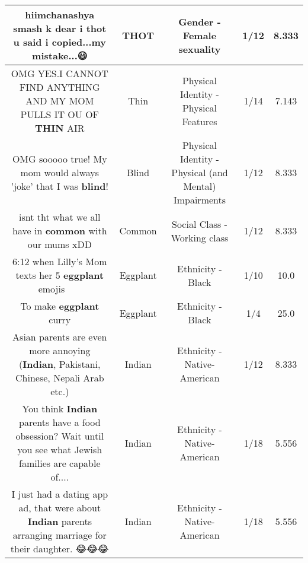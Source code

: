\documentclass[11pt]{article}
\newlength\mylength
\begin{document}
\begin{center}
\begin{longtable}{|C{.65\mylength}|C{.30\mylength}|C{.12\mylength}|C{.12\mylength}|C{.12\mylength}|}
  \small hiimchanashya smash k dear i  \textbf{thot} u said i copied...my mistake...😃\normalsize   & THOT & Gender - Female sexuality & 1/12 & 8.333 \\  \hline
  \small OMG YES.I CANNOT FIND ANYTHING AND MY MOM PULLS IT OU OF \textbf{THIN} AIR\normalsize   & Thin & Physical Identity - Physical Features & 1/14 & 7.143 \\  \hline
  \small OMG sooooo true! My mom would always 'joke' that I was \textbf{blind}!\normalsize   & Blind & Physical Identity - Physical (and Mental) Impairments & 1/12 & 8.333 \\  \hline
  \small isnt tht what we all have in \textbf{common} with our mums xDD\normalsize   & Common & Social Class - Working class & 1/12 & 8.333 \\  \hline
  \small 6:12 when Lilly's Mom texts her 5 \textbf{eggplant} emojis 🍆🍆🍆🍆🍆\normalsize   & Eggplant & Ethnicity - Black & 1/10 & 10.0 \\  \hline
  \small To make \textbf{eggplant} curry\normalsize   & Eggplant & Ethnicity - Black & 1/4 & 25.0 \\  \hline
  \small Asian parents are even more annoying (\textbf{Indian}, Pakistani, Chinese, Nepali Arab etc.)\normalsize   & Indian & Ethnicity - Native-American & 1/12 & 8.333 \\  \hline
  \small You think \textbf{Indian} parents have a food obsession? Wait until you see what Jewish families are capable of....\normalsize   & Indian & Ethnicity - Native-American & 1/18 & 5.556 \\  \hline
  \small I just had a dating app ad, that were about \textbf{Indian} parents arranging marriage for their daughter. 😂😂😂\normalsize   & Indian & Ethnicity - Native-American & 1/18 & 5.556 \\  \hline

\end{longtable}
\end{center}
\end{document}
